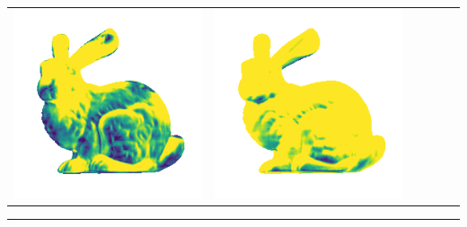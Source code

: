 \begin{tabularx}{\linewidth}{@{}Y@{}Y@{}Y@{}Y@{}Y@{}Y@{}}
\includegraphics[width=\linewidth]{semisynthetic/20150514_14_marrnet_err.png} &
\includegraphics[width=\linewidth]{semisynthetic/20150514_14_ef_err.png} \\
\end{tabularx}
\begin{center}\rule{0.5\linewidth}{\linethickness}\end{center}

